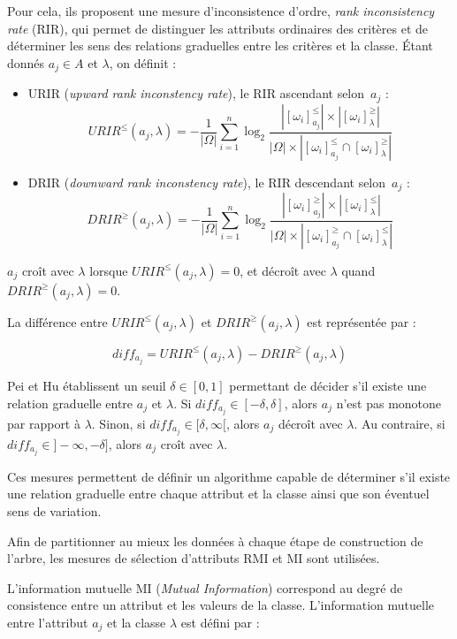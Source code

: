 \documentclass[a4paper]{article}
\begin{document}
Pour cela, ils proposent une mesure d'inconsistence d'ordre, \emph{rank
inconsistency rate} (RIR), qui permet de distinguer les attributs ordinaires des
critères et de déterminer les sens des relations graduelles entre les critères
et la classe. Étant donnés $a_j \in A$ et $\lambda$, on définit :

\begin{itemize}
    \item URIR (\emph{upward rank inconstency rate}), le RIR ascendant selon~$a_j$ :
        $$ URIR^{\leq}(a_j, \lambda) = -\frac{1}{|\Omega|} \sum_{i=1}^{n}\log_{2}
        \frac{|[\omega_i]^{\leq}_{a_j}| \times
        |[\omega_i]^{\geq}_{\lambda}|}{|\Omega| \times |[\omega_i]^{\leq}_{a_j}
        \cap [\omega_i]^{\geq}_{\lambda}|}$$ 
    \item DRIR (\emph{downward rank inconstency rate}), le RIR
        descendant selon~$a_j$ : 
        $$ DRIR^{\geq}(a_j, \lambda) = -\frac{1}{|\Omega|} \sum_{i=1}^{n}\log_{2}
        \frac{|[\omega_i]^{\geq}_{a_j}| \times
        |[\omega_i]^{\leq}_{\lambda}|}{|\Omega| \times |[\omega_i]^{\geq}_{a_j}
        \cap [\omega_i]^{\leq}_{\lambda}|}$$
\end{itemize}

$a_j$ croît avec $\lambda$ lorsque
$URIR^{\leq}(a_j,\lambda) = 0$, et décroît avec $\lambda$
quand $DRIR^{\geq}(a_j,\lambda) = 0$.

La différence entre $URIR^{\leq}(a_j,\lambda)$ et $DRIR^{\geq}(a_j,\lambda)$
est représentée par :

$$ diff_{a_j} = URIR^{\leq}(a_j,\lambda) - DRIR^{\geq}(a_j,\lambda)$$

Pei et Hu établissent un seuil $\delta \in [0,1]$ permettant de décider s'il
existe une relation graduelle entre $a_j$ et $\lambda$. Si $diff_{a_j} \in
[-\delta, \delta]$, alors $a_j$ n'est pas monotone par rapport à $\lambda$.
Sinon, si $diff_{a_j} \in [\delta, \infty[$, alors $a_j$ décroît avec $\lambda$.
Au contraire, si $diff_{a_j} \in ]-\infty, -\delta]$, alors $a_j$ croît avec
$\lambda$.

Ces mesures permettent de définir un algorithme capable de déterminer s'il
existe une relation graduelle entre chaque attribut et la classe ainsi que son
éventuel sens de variation.

Afin de partitionner au mieux les données à chaque étape de construction de
l'arbre, les mesures de sélection d'attributs RMI et MI sont utilisées. 

\noindent L'information mutuelle MI (\emph{Mutual Information}) correspond au degré de
consistence entre un attribut et les valeurs de la classe. L'information
mutuelle entre l'attribut $a_j$ et la classe $\lambda$ est défini par :
\end{document}
